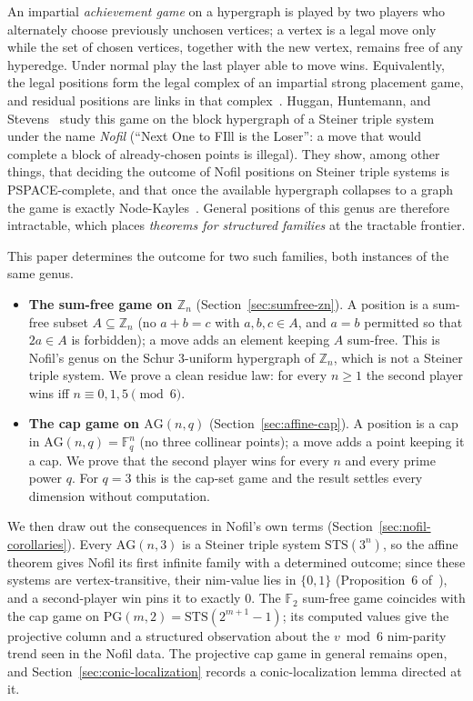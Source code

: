 \documentclass[11pt]{article}
\theoremstyle{plain}
\theoremstyle{definition}
\theoremstyle{remark}
\newcommand{\Zn}[1]{\mathbb{Z}_{#1}}
\newcommand{\Fq}{\mathbb{F}_q}
\newcommand{\AG}{\mathrm{AG}}
\newcommand{\PG}{\mathrm{PG}}
\newcommand{\STS}{\mathrm{STS}}
\begin{document}
An impartial \emph{achievement game} on a hypergraph is played by two players who alternately
choose previously unchosen vertices; a vertex is a legal move only while the set of chosen
vertices, together with the new vertex, remains free of any hyperedge. Under normal play the
last player able to move wins. Equivalently, the legal positions form the legal complex of an
impartial strong placement game, and residual positions are links in that
complex~\cite{faridi2019gamecomplexes,huntemann2019strongplacement}. Huggan, Huntemann, and
Stevens~\cite{huggan2022nofil} study this
game on the block hypergraph of a Steiner triple system under the name \emph{Nofil} (``Next One
to FIll is the Loser'': a move that would complete a block of already-chosen points is illegal).
They show, among other things, that deciding the outcome of Nofil positions on Steiner triple
systems is PSPACE-complete, and that once the available hypergraph collapses to a graph the game
is exactly Node-Kayles~\cite{sieben2023hypergraph}. General positions of this genus are therefore
intractable, which places \emph{theorems for structured families} at the tractable frontier.

This paper determines the outcome for two such families, both instances of the same genus.
\begin{itemize}
  \item \textbf{The sum-free game on $\Zn{n}$} (Section~\ref{sec:sumfree-zn}). A position is a
    sum-free subset $A \subseteq \Zn{n}$ (no $a+b=c$ with $a,b,c \in A$, and $a=b$ permitted so
    that $2a \in A$ is forbidden); a move adds an element keeping $A$ sum-free. This is Nofil's
    genus on the Schur $3$-uniform hypergraph of $\Zn{n}$, which is not a Steiner triple system.
    We prove a clean residue law: for every $n \geq 1$ the second player wins iff $n \equiv 0,1,5
    \pmod 6$.
  \item \textbf{The cap game on $\AG(n,q)$} (Section~\ref{sec:affine-cap}). A position is a cap
    in $\AG(n,q)=\Fq^n$ (no three collinear points); a move adds a point keeping it a cap. We
    prove that the second player wins for every $n$ and every prime power $q$. For $q=3$ this is
    the cap-set game and the result settles every dimension without computation.
\end{itemize}

We then draw out the consequences in Nofil's own terms (Section~\ref{sec:nofil-corollaries}).
Every $\AG(n,3)$ is a Steiner triple system $\STS(3^n)$, so the affine theorem gives Nofil its
first infinite family with a determined outcome; since these systems are vertex-transitive, their
nim-value lies in $\{0,1\}$ (Proposition~6 of~\cite{huggan2022nofil}), and a second-player win
pins it to exactly $0$. The $\mathbb{F}_2$ sum-free game coincides with the cap game on
$\PG(m,2)=\STS(2^{m+1}-1)$; its computed values give the projective column and a structured
observation about the $v \bmod 6$ nim-parity trend seen in the Nofil data. The projective cap
game in general remains open, and Section~\ref{sec:conic-localization} records a conic-localization
lemma directed at it.
\end{document}
